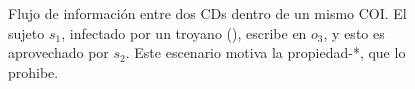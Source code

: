 \begin{figure}[h!]
\begin{minipage}{.96\textwidth}
  \caption{Flujo de información entre dos CDs dentro de un mismo COI\@. El
    sujeto $s_1$, infectado por un troyano (\symknight), escribe en $o_3$, y esto es
aprovechado por $s_2$. Este escenario motiva la propiedad-*, que lo
prohibe.\label{fig:BNstar}}
  \end{minipage}
\end{figure}
